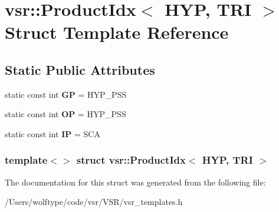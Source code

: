 \hypertarget{structvsr_1_1_product_idx_3_01_h_y_p_00_01_t_r_i_01_4}{\section{vsr\-:\-:Product\-Idx$<$ H\-Y\-P, T\-R\-I $>$ Struct Template Reference}
\label{structvsr_1_1_product_idx_3_01_h_y_p_00_01_t_r_i_01_4}
}
\subsection*{Static Public Attributes}
\begin{DoxyCompactItemize}
\item 
\hypertarget{structvsr_1_1_product_idx_3_01_h_y_p_00_01_t_r_i_01_4_a25323409e9333d497a9776868fe9dbe7}{static const int {\bfseries G\-P} = H\-Y\-P\-\_\-\-P\-S\-S}\label{structvsr_1_1_product_idx_3_01_h_y_p_00_01_t_r_i_01_4_a25323409e9333d497a9776868fe9dbe7}

\item 
\hypertarget{structvsr_1_1_product_idx_3_01_h_y_p_00_01_t_r_i_01_4_a5e109d4b796eb30135804a7040e3eb9b}{static const int {\bfseries O\-P} = H\-Y\-P\-\_\-\-P\-S\-S}\label{structvsr_1_1_product_idx_3_01_h_y_p_00_01_t_r_i_01_4_a5e109d4b796eb30135804a7040e3eb9b}

\item 
\hypertarget{structvsr_1_1_product_idx_3_01_h_y_p_00_01_t_r_i_01_4_a71ed7c8bf3572ca5802f1a4e4f43fbbf}{static const int {\bfseries I\-P} = S\-C\-A}\label{structvsr_1_1_product_idx_3_01_h_y_p_00_01_t_r_i_01_4_a71ed7c8bf3572ca5802f1a4e4f43fbbf}

\end{DoxyCompactItemize}
\subsubsection*{template$<$$>$ struct vsr\-::\-Product\-Idx$<$ H\-Y\-P, T\-R\-I $>$}



The documentation for this struct was generated from the following file\-:\begin{DoxyCompactItemize}
\item 
/\-Users/wolftype/code/vsr/\-V\-S\-R/vsr\-\_\-templates.\-h\end{DoxyCompactItemize}
